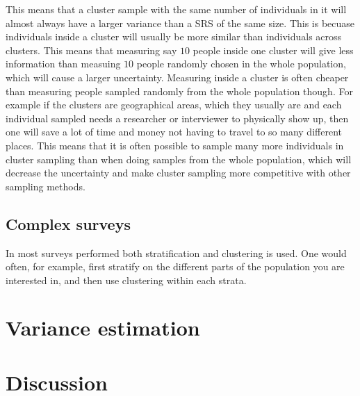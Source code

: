 \documentclass{article}
\begin{document}
This means that a cluster sample with the same number of individuals in it will
almost always have a larger variance than a SRS of the same size. This is
becuase individuals inside a cluster will usually be more similar than
individuals across clusters. This means that measuring say \(10\) people inside
one cluster will give less information than measuing \(10\) people randomly
chosen in the whole population, which will cause a larger uncertainty. Measuring
inside a cluster is often cheaper than measuring people sampled randomly from
the whole population though. For example if the clusters are geographical areas,
which they usually are and each individual sampled needs a researcher or
interviewer to physically show up, then one will save a lot of time and money
not having to travel to so many different places. This means that it is often possible to sample
many more individuals in cluster sampling than when doing samples from the whole
population, which will decrease the uncertainty and make cluster sampling more
competitive with other sampling methods.

\subsection{Complex surveys}

In most surveys performed both stratification and clustering is used. One would
often, for example, first stratify on the different parts of the population you
are interested in, and then use clustering within each strata.

\section{Variance estimation}

\section{Discussion}
\end{document}
